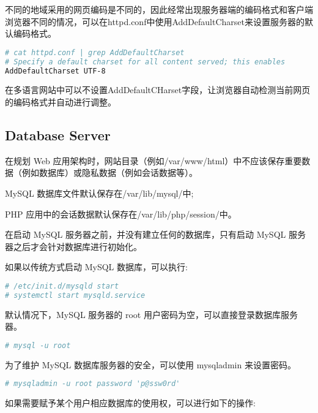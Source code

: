 不同的地域采用的网页编码是不同的，因此经常出现服务器端的编码格式和客户端浏览器不同的情况，可以在httpd.conf中使用AddDefaultCharset来设置服务器的默认编码格式。

\begin{lstlisting}[language=bash]
# cat httpd.conf | grep AddDefaultCharset
# Specify a default charset for all content served; this enables
AddDefaultCharset UTF-8
\end{lstlisting}

在多语言网站中可以不设置AddDefaultCHarset字段，让浏览器自动检测当前网页的编码格式并自动进行调整。




\subsection{Database Server}

在规划 Web 应用架构时，网站目录（例如/var/www/html）中不应该保存重要数据（例如数据库）或隐私数据（例如会话数据等）。

\begin{compactitem}
\item MySQL 数据库文件默认保存在/var/lib/mysql/中;
\item PHP 应用中的会话数据默认保存在/var/lib/php/session/中。
\end{compactitem}

在启动 MySQL 服务器之前，并没有建立任何的数据库，只有启动 MySQL 服务器之后才会针对数据库进行初始化。

如果以传统方式启动 MySQL 数据库，可以执行:


\begin{lstlisting}[language=bash]
# /etc/init.d/mysqld start
# systemctl start mysqld.service
\end{lstlisting}


默认情况下，MySQL 服务器的 root 用户密码为空，可以直接登录数据库服务器。

\begin{lstlisting}[language=bash]
# mysql -u root
\end{lstlisting}

为了维护 MySQL 数据库服务器的安全，可以使用 mysqladmin 来设置密码。


\begin{lstlisting}[language=bash]
# mysqladmin -u root password 'p@ssw0rd'
\end{lstlisting}


如果需要赋予某个用户相应数据库的使用权，可以进行如下的操作:


